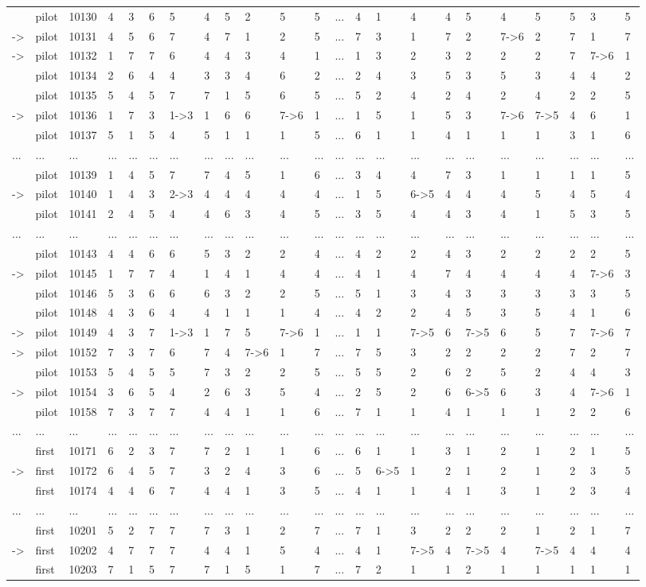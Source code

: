 \documentclass[6pt]{article}
\begin{document}
\begin{landscape}
{\begin{longtable}{lllllllllllllllllllllll}
&pilot&10130&4&3&6&5&4&5&2&5&5&...&4&1&4&4&5&4&5&5&3&5\tabularnewline
-\textgreater &pilot&10131&4&5&6&7&4&7&1&2&5&...&7&3&1&7&2&7-\textgreater 6&2&7&1&7\tabularnewline
-\textgreater &pilot&10132&1&7&7&6&4&4&3&4&1&...&1&3&2&3&2&2&2&7&7-\textgreater 6&1\tabularnewline
&pilot&10134&2&6&4&4&3&3&4&6&2&...&2&4&3&5&3&5&3&4&4&2\tabularnewline
&pilot&10135&5&4&5&7&7&1&5&6&5&...&5&2&4&2&4&2&4&2&2&5\tabularnewline
-\textgreater &pilot&10136&1&7&3&1-\textgreater 3&1&6&6&7-\textgreater 6&1&...&1&5&1&5&3&7-\textgreater 6&7-\textgreater 5&4&6&1\tabularnewline
&pilot&10137&5&1&5&4&5&1&1&1&5&...&6&1&1&4&1&1&1&3&1&6\tabularnewline
...&...&...&...&...&...&...&...&...&...&...&...&...&...&...&...&...&...&...&...&...&...&...\tabularnewline
&pilot&10139&1&4&5&7&7&4&5&1&6&...&3&4&4&7&3&1&1&1&1&5\tabularnewline
-\textgreater &pilot&10140&1&4&3&2-\textgreater 3&4&4&4&4&4&...&1&5&6-\textgreater 5&4&4&4&5&4&5&4\tabularnewline
&pilot&10141&2&4&5&4&4&6&3&4&5&...&3&5&4&4&3&4&1&5&3&5\tabularnewline
...&...&...&...&...&...&...&...&...&...&...&...&...&...&...&...&...&...&...&...&...&...&...\tabularnewline
&pilot&10143&4&4&6&6&5&3&2&2&4&...&4&2&2&4&3&2&2&2&2&5\tabularnewline
-\textgreater &pilot&10145&1&7&7&4&1&4&1&4&4&...&4&1&4&7&4&4&4&4&7-\textgreater 6&3\tabularnewline
&pilot&10146&5&3&6&6&6&3&2&2&5&...&5&1&3&4&3&3&3&3&3&5\tabularnewline
&pilot&10148&4&3&6&4&4&1&1&1&4&...&4&2&2&4&5&3&5&4&1&6\tabularnewline
-\textgreater &pilot&10149&4&3&7&1-\textgreater 3&1&7&5&7-\textgreater 6&1&...&1&1&7-\textgreater 5&6&7-\textgreater 5&6&5&7&7-\textgreater 6&7\tabularnewline
-\textgreater &pilot&10152&7&3&7&6&7&4&7-\textgreater 6&1&7&...&7&5&3&2&2&2&2&7&2&7\tabularnewline
&pilot&10153&5&4&5&5&7&3&2&2&5&...&5&5&2&6&2&5&2&4&4&3\tabularnewline
-\textgreater &pilot&10154&3&6&5&4&2&6&3&5&4&...&2&5&2&6&6-\textgreater 5&6&3&4&7-\textgreater 6&1\tabularnewline
&pilot&10158&7&3&7&7&4&4&1&1&6&...&7&1&1&4&1&1&1&2&2&6\tabularnewline
...&...&...&...&...&...&...&...&...&...&...&...&...&...&...&...&...&...&...&...&...&...&...\tabularnewline
&first&10171&6&2&3&7&7&2&1&1&6&...&6&1&1&3&1&2&1&2&1&5\tabularnewline
-\textgreater &first&10172&6&4&5&7&3&2&4&3&6&...&5&6-\textgreater 5&1&2&1&2&1&2&3&5\tabularnewline
&first&10174&4&4&6&7&4&4&1&3&5&...&4&1&1&4&1&3&1&2&3&4\tabularnewline
...&...&...&...&...&...&...&...&...&...&...&...&...&...&...&...&...&...&...&...&...&...&...\tabularnewline
&first&10201&5&2&7&7&7&3&1&2&7&...&7&1&3&2&2&2&1&2&1&7\tabularnewline
-\textgreater &first&10202&4&7&7&7&4&4&1&5&4&...&4&1&7-\textgreater 5&4&7-\textgreater 5&4&7-\textgreater 5&4&4&4\tabularnewline
&first&10203&7&1&5&7&7&1&5&1&7&...&7&2&1&1&2&1&1&1&1&1\tabularnewline

\end{longtable}}
\end{landscape}
\end{document}
